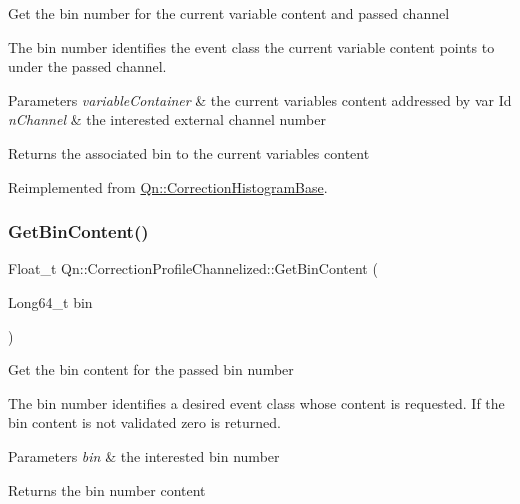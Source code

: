 Get the bin number for the current variable content and passed channel

The bin number identifies the event class the current variable content points to under the passed channel.


\begin{DoxyParams}{Parameters}
{\em variable\+Container} & the current variables content addressed by var Id \\
\hline
{\em n\+Channel} & the interested external channel number \\
\hline
\end{DoxyParams}
\begin{DoxyReturn}{Returns}
the associated bin to the current variables content 
\end{DoxyReturn}


Reimplemented from \mbox{\hyperlink{classQn_1_1CorrectionHistogramBase_acfde166908e4da950470841f21f87fb9}{Qn\+::\+Correction\+Histogram\+Base}}.

\mbox{\label{classQn_1_1CorrectionProfileChannelized_a45d475d580d3c5dfe9d139552eab766b}} 
\subsubsection{\texorpdfstring{Get\+Bin\+Content()}{GetBinContent()}}
{\footnotesize\ttfamily Float\+\_\+t Qn\+::\+Correction\+Profile\+Channelized\+::\+Get\+Bin\+Content (\begin{DoxyParamCaption}\item[{Long64\+\_\+t}]{bin }\end{DoxyParamCaption})\hspace{0.3cm}{\ttfamily [virtual]}}

Get the bin content for the passed bin number

The bin number identifies a desired event class whose content is requested. If the bin content is not validated zero is returned.


\begin{DoxyParams}{Parameters}
{\em bin} & the interested bin number \\
\hline
\end{DoxyParams}
\begin{DoxyReturn}{Returns}
the bin number content 
\end{DoxyReturn}


